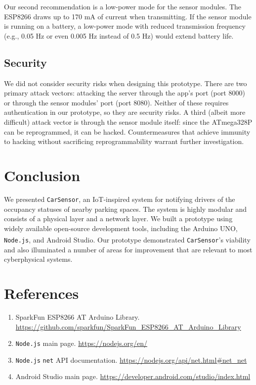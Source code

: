 \documentclass[conference]{IEEEtran}
\begin{document}
Our second recommendation is a low-power mode for the sensor modules. The ESP8266 draws up to 170 mA of current when transmitting. If the sensor module is running on a battery, a low-power mode with reduced transmission frequency (e.g., 0.05 Hz or even 0.005 Hz instead of 0.5 Hz) would extend battery life.
\subsection{Security}
We did not consider security risks when designing this prototype. There are two primary attack vectors: attacking the server through the app's port (port 8000) or through the sensor modules' port (port 8080). Neither of these requires authentication in our prototype, so they are security risks. A third (albeit more difficult) attack vector is through the sensor module itself: since the ATmega328P can be reprogrammed, it can be hacked. Countermeasures that achieve immunity to hacking without sacrificing reprogrammability warrant further investigation.
\section{Conclusion}\label{sec_conc}
We presented \texttt{CarSensor}, an IoT-inspired system for notifying drivers of the occupancy statuses of nearby parking spaces. The system is highly modular and consists of a physical layer and a network layer. We built a prototype using widely available open-source development tools, including the Arduino UNO, \texttt{Node.js}\textsuperscript{\textregistered}, and Android Studio. Our prototype demonstrated \texttt{CarSensor}'s viability and also illuminated a number of areas for improvement that are relevant to most cyberphysical systems.

\section*{References}
\begin{enumerate}
\item SparkFun ESP8266 AT Arduino Library. \url{https://github.com/sparkfun/SparkFun_ESP8266_AT_Arduino_Library}
\item \texttt{Node.js} main page. \url{https://nodejs.org/en/}
\item \texttt{Node.js} \texttt{net} API documentation. \url{https://nodejs.org/api/net.html\#net_net}
\item Android Studio main page. \url{https://developer.android.com/studio/index.html}

\end{enumerate}
\end{document}
